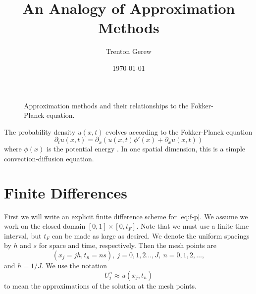 \documentclass[reqno,11pt]{article}
\date{\today}%
\begin{document}
\title{An Analogy of Approximation Methods}
\author{Trenton Gerew}

\maketitle
	\begin{figure}[h!]
		\centering
		
		
		\caption{Approximation methods and their relationships to the Fokker-Planck equation. \label{fig:relationships}}
	\end{figure}

	The probability density $u (x,t)$ evolves according to the Fokker-Planck equation
	\begin{equation}
		\label{eq:f-p}
		\partial_t u (x,t) = \partial_x \left( u (x,t) \phi' (x) + \partial_x u (x,t) \right)
	\end{equation}
	where $\phi (x)$ is the potential energy \cite{WANG2003491}.
	In one spatial dimension, this is a simple convection-diffusion equation.
	
	\section{Finite Differences}
	First we will write an explicit finite difference scheme for \eqref{eq:f-p}.
	We assume we work on the closed domain $[0,1] \times [0,t_F]$.
	Note that we must use a finite time interval, but $t_F$ can be made as large as desired.
	We denote the uniform spacings by $h$ and $s$ for space and time, respectively.
	Then the mesh points are
	\begin{equation*}
		(x_j = j h, t_n = n s), \ j = 0,1,2\dots,J, \ n = 0,1,2,\dots,
	\end{equation*}
	and $h = 1 / J$.
	We use the notation
	\begin{equation*}
		U_j^n \approx u (x_j,t_n)
	\end{equation*}
	to mean the approximations of the solution at the mesh points.
	
\end{document}
